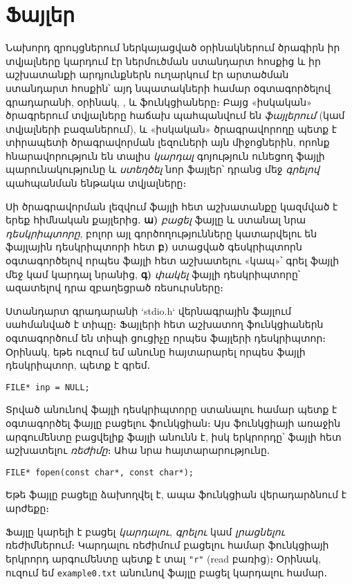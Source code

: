 \chapter{Ֆայլեր}


Նախորդ զրույցներում ներկայացված օրինակներում ծրագիրն իր
տվյալները կարդում էր ներմուծման ստանդարտ հոսքից և իր
աշխատանքի արդյունքներն ուղարկում էր արտածման ստանդարտ
հոսքին՝ այդ նպատակների համար օգտագործելով 
գրադարանի, օրինակ, ,  և
 ֆունկցիաները։ Բայց «իսկական» ծրագրերում
տվյալները հաճախ պահպանվում են \emph{ֆայլերում} (կամ տվյալների
բազաներում), և «իսկական» ծրագրավորողը պետք է տիրապետի
ծրագրավորման լեզուների այն միջոցներին, որոնք հնարավորություն
են տալիս \emph{կարդալ} գոյություն ունեցող ֆայլի պարունակությունը
և \emph{ստեղծել} նոր ֆայլեր՝ դրանց մեջ \emph{գրելով} պահպանման
ենթակա տվյալները։

Սի ծրագրավորման լեզվում ֆայլի հետ աշխատանքը կազմված է երեք
հիմնական քայլերից․ \textbf{ա)} \emph{բացել} ֆայլը և ստանալ նրա
\emph{դեսկրիպտորը}, բոլոր այլ գործողությունները կատարվելու են
ֆայլային դեսկրիպտորի հետ \textbf{բ)} ստացված գեսկրիպտորն
օգտագործելով որպես ֆայլի հետ աշխատելու «կապ»՝ գրել ֆայլի մեջ
կամ կարդալ նրանից, \textbf{գ)} \emph{փակել} ֆայլի դեսկրիպտորը՝
ազատելով դրա զբաղեցրած ռեսուրսները։

Ստանդարտ գրադարանի `stdio.h` վերնագրային ֆայլում սահմանված
է  տիպը։ Ֆայլերի հետ աշխատող ֆունկցիաներն օգտագործում
են  տիպի ցուցիչը որպես ֆայլերի դեսկրիպտոր։ Օրինակ,
եթե ուզում եմ  անունը հայտարարել որպես ֆայլի դեսկրիպտոր,
պետք է գրեմ․

\begin{Verbatim}
FILE* inp = NULL;
\end{Verbatim}

Տրված անունով ֆայլի դեսկրիպտորը ստանալու համար պետք է օգտագործել
ֆայլը բացելու  ֆունկցիան։ Այս ֆունկցիայի առաջին
արգումենտը բացվելիք ֆայլի անունն է, իսկ երկրորդը՝ ֆայլի հետ
աշխատելու \emph{ռեժիմը}։ Ահա նրա հայտարարությունը․

\begin{Verbatim}
FILE* fopen(const char*, const char*);
\end{Verbatim}

Եթե ֆայլը բացելը ձախողվել է, ապա  ֆունկցիան վերադարձնում
է  արժեքը։

Ֆայլը կարելի է բացել \emph{կարդալու}, \emph{գրելու} կամ
\emph{լրացնելու} ռեժիմներում։ Կարդալու ռեժիմում բացելու համար
 ֆունկցիայի երկրորդ արգումենտը պետք է տալ \Verb|"r"|
(read բառից)։ Օրինակ, ուզում եմ \texttt{example0.txt} անունով
ֆայլը բացել կարդալու համար․

